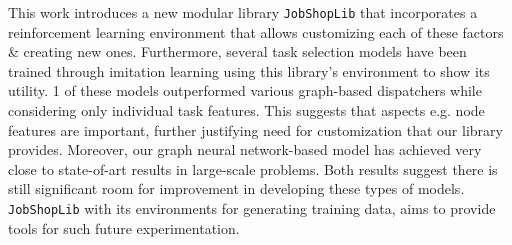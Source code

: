 \documentclass{article}
\begin{document}
\begin{itemize}
    This work introduces a new modular library {\tt JobShopLib} that incorporates a reinforcement learning environment that allows customizing each of these factors \& creating new ones. Furthermore, several task selection models have been trained through imitation learning using this library's environment to show its utility. 1 of these models outperformed various graph-based dispatchers while considering only individual task features. This suggests that aspects e.g. node features are important, further justifying need for customization that our library provides. Moreover, our graph neural network-based model has achieved very close to state-of-art results in large-scale problems. Both results suggest there is still significant room for improvement in developing these types of models. {\tt JobShopLib} with its environments for generating training data, aims to provide tools for such future experimentation.


\end{itemize}
\end{document}
